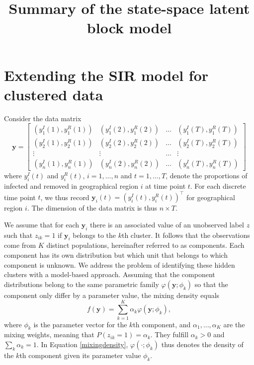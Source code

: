 \documentclass[10pt,a4paper]{article}
\author{}
\date{}
\title{Summary of the state-space latent block model}
\begin{document}
\maketitle

\section{Extending the SIR model for clustered data}

Consider the data matrix
%
$$
\mathbf{y} = \begin{bmatrix}
	(y^I_1(1), y^R_1(1)) & (y^I_1(2), y^R_1(2)) & \ldots & (y^I_1(T), y^R_1(T))\\
	(y^I_2(1), y^R_2(1)) & (y^I_2(2), y^R_2(2)) & \ldots & (y^I_2(T), y^R_2(T))\\
	\vdots & \vdots & \ldots & \vdots \\
	(y^I_n(1), y^R_n(1)) & (y^I_n(2), y^R_n(2)) & \ldots & (y^I_n(T), y^R_n(T))
\end{bmatrix}
$$
%
where $y_i^I(t)$ and $y_i^R(t)$, $i = 1, \ldots, n$ and $t = 1, \ldots, T$, denote the proportions of infected and removed in geographical region $i$ at time point $t$. For each discrete time point $t$, we thus record $\mathbf{y}_i(t) = (y_i^I(t), y_i^R(t))^\top$ for geographical region $i$. The dimension of the data matrix is thus $n \times T$.

We assume that for each $\mathbf{y}_i$ there is an associated value of an unobserved label $z$ such that $z_{ik} = 1$ if $\mathbf{y}_i$ belongs to the $k$th cluster. It follows that the observations come from $K$ distinct populations, hereinafter referred to as components. Each component has its own distribution but which unit that belongs to which component is unknown. We address the problem of identifying these hidden clusters with a model-based approach. Assuming that the component distributions belong to the same parametric family $\varphi(\mathbf{y}; \phi_k)$ so that the component only differ by a parameter value, the mixing density equals
%
\begin{equation}\label{mixingdensity}
	f(\mathbf{y}) = \sum_{k=1}^{K} \alpha_k \varphi(\mathbf{y}; \phi_k),
\end{equation}
%
where $\phi_k$ is the parameter vector for the $k$th component, and $\alpha_1, \ldots, \alpha_K$ are the mixing weights, meaning that $P(z_{ik} = 1) = \alpha_k$. They fulfill $\alpha_k > 0$ and $\sum_{k} \alpha_k = 1$. In Equation \ref{mixingdensity}, $\varphi(\cdot; \phi_k)$ thus denotes the density of the $k$th component given its parameter value $\phi_k$. 
\end{document}
